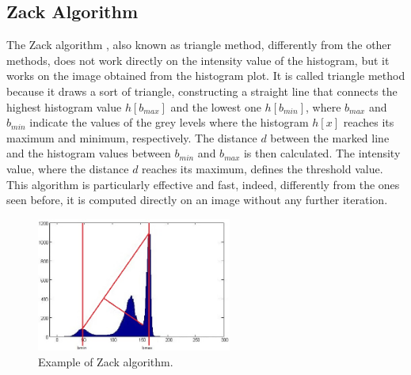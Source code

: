\subsection{Zack Algorithm} \label{Zack} %
The Zack algorithm \cite{Zack}, also known as triangle method, differently from the other methods, does not work directly on the intensity value of the histogram, but it works on the image obtained from the histogram plot. It is called triangle method because it draws a sort of triangle, constructing a straight line that connects the highest histogram value $h[b_{max}]$ and the lowest one $h[b_{min}]$, where $b_{max}$ and $ b_{min}$ indicate the values of the grey levels where the histogram $h[x]$ reaches its maximum and minimum, respectively. The distance $d$ between the marked line and the histogram values between $b_{min}$ and $b_{max}$ is then calculated. The intensity value, where the distance $d$ reaches its maximum, defines the threshold value. This algorithm is particularly effective and fast, indeed, differently from the ones seen before, it is computed directly on an image without any further iteration.

\begin{figure}[h]
	\centering
	\includegraphics[width=0.57\textwidth]{images/Zack}
	\caption[Example of Zack algorithm.]{\label{fig:exampleZack}Example of Zack algorithm.}
\end{figure}


